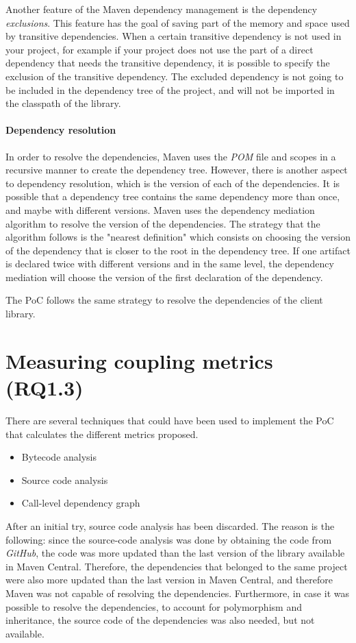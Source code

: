 Another feature of the Maven dependency management is the dependency \textit{exclusions}. This feature has the goal of saving part of the memory and space used by transitive dependencies. When a certain transitive dependency is not used in your project, for example if your project does not use the part of a direct dependency that needs the transitive dependency, it is possible to specify the exclusion of the transitive dependency. The excluded dependency is not going to be included in the dependency tree of the project, and will not be imported in the classpath of the library.

\paragraph{Dependency resolution}
In order to resolve the dependencies, Maven uses the \textit{POM} file and scopes in a recursive manner to create the dependency tree. However, there is another aspect to dependency resolution, which is the version of each of the dependencies. It is possible that a dependency tree contains the same dependency more than once, and maybe with different versions. Maven uses the dependency mediation algorithm to resolve the version of the dependencies. The strategy that the algorithm follows is the "nearest definition" which consists on choosing the version of the dependency that is closer to the root in the dependency tree. If one artifact is declared twice with different versions and in the same level, the dependency mediation will choose the version of the first declaration of the dependency.

The PoC follows the same strategy to resolve the dependencies of the client library.

\section{Measuring coupling metrics (RQ1.3)}
There are several techniques that could have been used to implement the PoC that calculates the different metrics proposed.

\begin{itemize}
  \item Bytecode analysis
  \item Source code analysis
  \item Call-level dependency graph
\end{itemize}

After an initial try, source code analysis has been discarded. The reason is the following: since the source-code analysis was done by obtaining the code from \textit{GitHub}, the code was more updated than the last version of the library available in Maven Central. Therefore, the dependencies that belonged to the same project were also more updated than the last version in Maven Central, and therefore Maven was not capable of resolving the dependencies. Furthermore, in case it was possible to resolve the dependencies, to account for polymorphism and inheritance, the source code of the dependencies was also needed, but not available.

